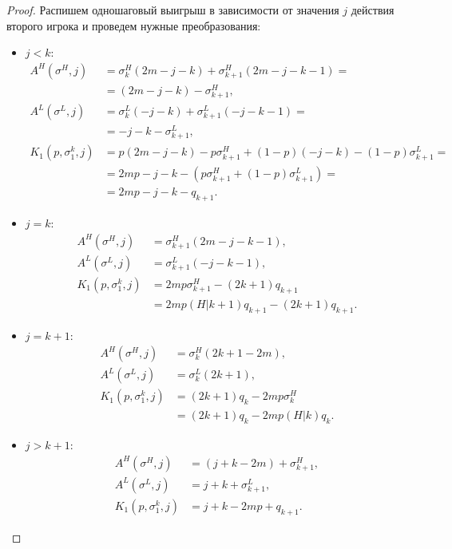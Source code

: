 \begin{proof}
Распишем одношаговый выигрыш в зависимости от значения $ j $ действия второго игрока и проведем нужные преобразования:
\begin{itemize}
    \item
    $ j < k $:
    \begin{align*}
        A^H(\sigma^H, j)
        &= \sigma^H_k (2m - j - k) + \sigma^H_{k+1} (2m - j - k - 1) =  \\
        &= (2m - j - k) - \sigma^H_{k+1},& \\
        A^L(\sigma^L, j)
        &= \sigma^L_k (-j - k) + \sigma^L_{k+1} (-j - k - 1) = \\
        &= - j - k - \sigma^L_{k+1},& \\
        K_1(p, \sigma^k_1, j) 
        &= p (2m - j - k) - p\sigma^H_{k+1} + 
            (1-p)(-j - k) - (1-p)\sigma^L_{k+1} = \\
        &= 2mp - j - k - (p\sigma^H_{k+1} + (1-p)\sigma^L_{k+1}) =\\
        &= 2mp - j - k - q_{k+1}.
    \end{align*}
    \item
    $ j = k $:
    \begin{align*}
        A^H(\sigma^H, j) &= \sigma^H_{k+1} (2m - j -k - 1), \\
        A^L(\sigma^L, j) &= \sigma^L_{k+1} (-j - k - 1), \\
        K_1(p, \sigma^k_1, j) &= 2mp\sigma^H_{k+1} - (2k+1)q_{k+1} \\
        &= 2mp(H|k+1)q_{k+1} - (2k+1)q_{k+1}.
    \end{align*}
    \item
    $ j = k+1 $:
    \begin{align*}
        A^H(\sigma^H, j) &= \sigma^H_k (2k + 1 - 2m), \\
        A^L(\sigma^L, j) &= \sigma^L_k (2k + 1), \\
        K_1(p, \sigma^k_1, j) &= (2k+1)q_k - 2mp\sigma^H_k \\
        &= (2k+1)q_k - 2mp(H|k)q_k.
    \end{align*}
    \item
    $ j > k + 1 $:
    \begin{align*}
        A^H(\sigma^H, j) &= (j + k - 2m) + \sigma^H_{k+1}, \\
        A^L(\sigma^L, j) &= j + k + \sigma^L_{k+1}, \\
        K_1(p, \sigma^k_1, j) &= j + k - 2mp + q_{k+1}.
    \end{align*}
\end{itemize}
\end{proof}

